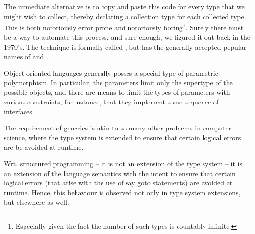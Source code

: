 The immediate alternative is to copy and paste this code for every type that we
might wish to collect, thereby declaring a collection type for each collected
type.  This is both notoriously error prone and notoriously
boring\footnote{Especially given the fact the number of such types is countably
infinite.}. Surely there must be a way to automate this process, and sure
enough, we figured it out back in the
1970's\cite{the-c++-programming-language}. The technique is formally called
, but has the generally accepted popular names of
 and .

Object-oriented languages generally posses a special type of parametric
polymorphism. In particular, the parameters limit only the supertype of the
possible objects, and there are means to limit the types of parameters with
various constraints, for instance, that they implement some sequence of
interfaces.

\newpage


The requirement of generics is akin to so many other problems in computer
science, where the type system is extended to ensure that certain logical
errors are be avoided at runtime.

Wrt. structured programming -- it is not an extension of the type system -- it
is an extension of the language semantics with the intent to ensure that
certain logical errors (that arise with the use of say goto statements) are
avoided at runtime. Hence, this behaviour is observed not only in type system
extensions, but elsewhere as well.
